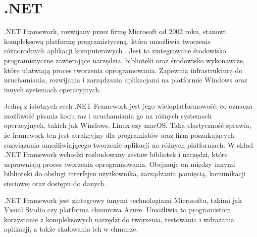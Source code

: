 \section{.NET}

.NET Framework, rozwijany przez firmę Microsoft od 2002 roku, stanowi kompleksową platformę programistyczną, która umożliwia tworzenie różnorodnych aplikacji komputerowych \cite{microsoftNETBuild}.
Jest to zintegrowane środowisko programistyczne zawierające narzędzia, biblioteki oraz środowisko wykonawcze, które ułatwiają proces tworzenia oprogramowania.
Zapewnia infrastrukturę do uruchamiania, rozwijania i zarządzania aplikacjami na platformie Windows oraz innych systemach operacyjnych.

Jedną z istotnych cech .NET Framework jest jego wieloplatformowość, co oznacza możliwość pisania kodu raz i uruchamiania go na różnych systemach operacyjnych, takich jak Windows, Linux czy macOS.
Taka elastyczność sprawia, że framework ten jest atrakcyjny dla programistów oraz firm poszukujących rozwiązania umożliwiającego tworzenie aplikacji na różnych platformach.
W skład .NET Framework wchodzi rozbudowany zestaw bibliotek i narzędzi, które usprawniają proces tworzenia oprogramowania.
Obejmuje on między innymi biblioteki do obsługi interfejsu użytkownika, zarządzania pamięcią, komunikacji sieciowej oraz dostępu do danych.

.NET Framework jest zintegrowy innymi technologiami Microsoftu, takimi jak Visual Studio czy platforma chmurowa Azure.
Umożliwia to programistom korzystanie z kompleksowych narzędzi do tworzenia, testowania i wdrażania aplikacji, a także skalowania ich w chmurze.